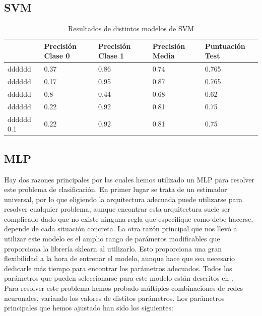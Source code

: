 \documentclass[journal,twoside]{JoPhA}
\begin{document}
\subsection{SVM}
	
\begin{table}[htb!]
	\begin{center}
		\caption{Resultados de distintos modelos de SVM}
		\begin{tabular}{| p{2.1cm} | p{1cm} | p{1cm} | p{1cm} | p{1.2cm} |}
			\hline
			& Precisión Clase 0 & Precisión Clase 1 & Precisión Media & Puntuación Test   \\ \hline
			dddddd & 0.37                & 0.86                & 0.74              & 0.765  \\ \hline
			dddddd & 0.17                & 0.95               & 0.87             & 0.765  \\ \hline
			dddddd & 0.8 & 0.44 & 0.68 & 0.62 \\ \hline
			dddddd & 0.22 & 0.92 & 0.81 & 0.75	\\ \hline
			dddddd 0.1 & 0.22 & 0.92 & 0.81 & 0.75 \\ \hline
			
		\end{tabular}
		
		\label{tabla:tabla_svm}
	\end{center}
\end{table}

\subsection{MLP}
Hay dos razones principales por las cuales hemos utilizado un MLP para resolver este problema de clasificación. En primer lugar se trata de un estimador universal, por lo que eligiendo la arquitectura adecuada puede utilizarse para resolver cualquier problema, aunque encontrar esta arquitectura suele ser complicado dado que no existe ninguna regla que especifique como debe hacerse, depende de cada situación concreta. La otra razón principal que nos llevó a utilizar este modelo es el amplio rango de parámeros modificables que proporciona la librería sklearn al utilizarlo. Esto proporciona una gran flexibilidad a la hora de entrenar el modelo, aunque hace que sea necesario dedicarle más tiempo para encontrar los parámetros adecuados. Todos los parámetros que pueden seleccionarse para este modelo están descritos en \cite{mlp}. \\

Para resolver este problema hemos probado múltiples combinaciones de redes neuronales, variando los valores de distitos parámetros. Los parámetros principales que hemos ajustado han sido los siguientes: \\
\end{document}
